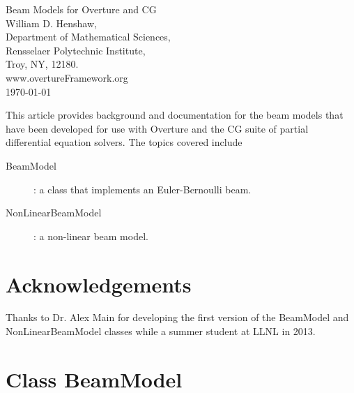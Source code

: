 \documentclass[11pt]{article}
\begin{document}
\baselineskip
\begin{flushleft}
{\LARGE Beam Models for Overture and CG} \\
\vspace{2\baselineskip}
William D. Henshaw, \\
Department of Mathematical Sciences, \\
Rensselaer Polytechnic Institute,     \\
Troy, NY, 12180.  \\
www.overtureFramework.org \\
\vspace{2\baselineskip}
\today
\vspace{4\baselineskip}
% 
\end{flushleft}
%
%
 This article provides background and documentation for
the beam models that have been developed for use with Overture and the CG suite of partial differential
equation solvers. The topics covered include
\begin{description}
  \item[BeamModel] : a class that implements an Euler-Bernoulli beam.
  \item[NonLinearBeamModel] : a non-linear beam model.
\end{description}


\clearpage
\tableofcontents
\section{Acknowledgements}

Thanks to Dr. Alex Main for developing the first version of the BeamModel and NonLinearBeamModel classes while
a summer student at LLNL in 2013.

\section{Class BeamModel}\label{sec:BeamModel}
\end{document}
